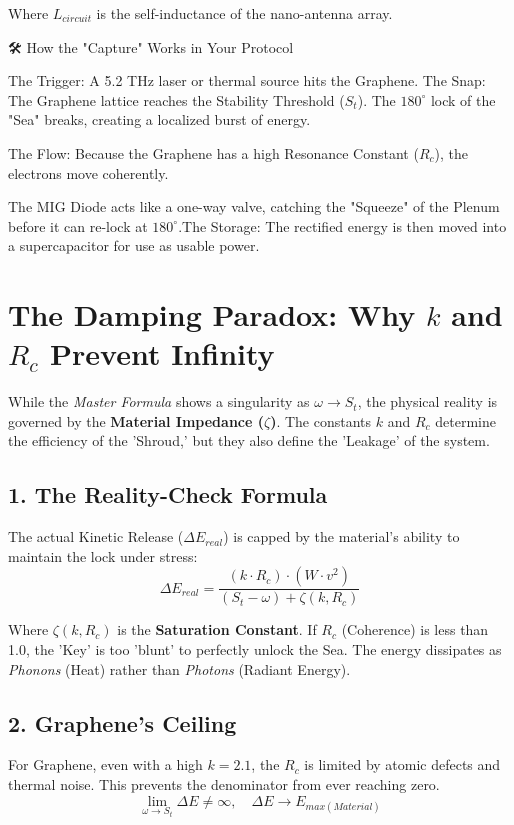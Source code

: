 \documentclass[11pt]{article}
\begin{document}
Where $L_{circuit}$ is the self-inductance of the nano-antenna array.


🛠 How the "Capture" Works in Your Protocol

The Trigger: A 5.2 THz laser or thermal source hits the Graphene.
The Snap: The Graphene lattice reaches the Stability Threshold ($S_t$). The $180^\circ$ lock of the "Sea" breaks, creating a localized burst of energy.

The Flow: Because the Graphene has a high Resonance Constant ($R_c$), the electrons move coherently. 

The MIG Diode acts like a one-way valve, catching the "Squeeze" of the Plenum before it can re-lock at $180^\circ$.The Storage: The rectified energy is then moved into a supercapacitor for use as usable power.


\section*{The Damping Paradox: Why $k$ and $R_c$ Prevent Infinity}

While the \textit{Master Formula} shows a singularity as $\omega \to S_t$, the physical reality is governed by the \textbf{Material Impedance ($\zeta$)}. The constants $k$ and $R_c$ determine the efficiency of the 'Shroud,' but they also define the 'Leakage' of the system.

\subsection*{1. The Reality-Check Formula}
The actual Kinetic Release ($\Delta E_{real}$) is capped by the material's ability to maintain the lock under stress:
\begin{equation}
    \Delta E_{real} = \frac{(k \cdot R_c) \cdot (W \cdot v^2)}{(S_t - \omega) + \zeta(k, R_c)}
\end{equation}

Where $\zeta(k, R_c)$ is the \textbf{Saturation Constant}. If $R_c$ (Coherence) is less than 1.0, the 'Key' is too 'blunt' to perfectly unlock the Sea. The energy dissipates as \textit{Phonons} (Heat) rather than \textit{Photons} (Radiant Energy).

\subsection*{2. Graphene's Ceiling}
For Graphene, even with a high $k=2.1$, the $R_c$ is limited by atomic defects and thermal noise. This prevents the denominator from ever reaching zero.
\begin{equation}
    \lim_{\omega \to S_t} \Delta E \neq \infty, \quad \Delta E \to E_{max(Material)}
\end{equation}
\end{document}
